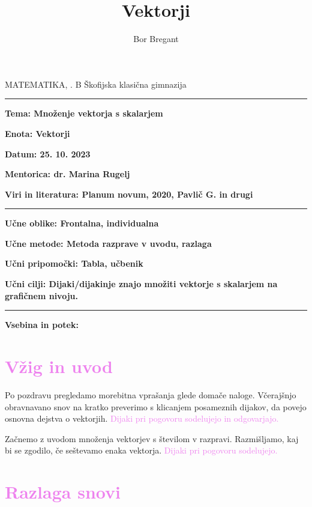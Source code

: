 \documentclass{article}
\title{Vektorji}
\author{Bor Bregant}
\date{\vspace{-5ex}}
\begin{document}
\thispagestyle{empty}	%

\noindent MATEMATIKA, . B \hfill Škofijska klasična gimnazija
\hrule
\vspace{1ex}
\noindent \textbf{Tema: Množenje vektorja s skalarjem}
\vspace{1ex}

\noindent \textbf{Enota: Vektorji}
\vspace{1ex}

\noindent \textbf{Datum: 25. 10. 2023}
\vspace{1ex}

\noindent \textbf{Mentorica: dr. Marina Rugelj}
\vspace{1ex}

\noindent \textbf{Viri in literatura: Planum novum, 2020, Pavlič G. in drugi}
\vspace{1ex}
\hrule
\vspace{2ex}
\noindent \textbf{Učne oblike: Frontalna, individualna}
\vspace{1ex}

\noindent \textbf{Učne metode: Metoda razprave v uvodu, razlaga}
\vspace{1ex}

\noindent \textbf{Učni pripomočki: Tabla, učbenik}
\vspace{1ex}

\noindent \textbf{Učni cilji: Dijaki/dijakinje znajo množiti vektorje s skalarjem na grafičnem nivoju.} 
\vspace{4ex}
\hrule
\vspace{5ex}
\noindent \textbf{Vsebina in potek:} 

\newpage

\section*{\textcolor{violet}{Vžig in uvod}}

Po pozdravu pregledamo morebitna vprašanja glede domače naloge. Včerajšnjo obravnavano snov na kratko preverimo s klicanjem posameznih dijakov, da povejo osnovna dejstva o vektorjih. \textcolor{violet}{Dijaki pri pogovoru sodelujejo in odgovarjajo.}

Začnemo z uvodom množenja vektorjev s številom v razpravi. Razmišljamo, kaj bi se zgodilo, če seštevamo enaka vektorja. \textcolor{violet}{Dijaki pri pogovoru sodelujejo.}


\section*{\textcolor{violet}{Razlaga snovi}}
\end{document}
